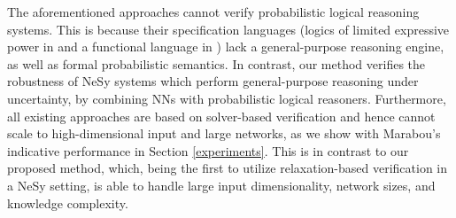 The aforementioned approaches cannot verify probabilistic logical reasoning systems. This is because their specification languages (logics of limited expressive power in \cite{akintunde2020verifying,xie2022neuro} and a functional language in \cite{daggitt2024vehiclebridgingembeddinggap}) lack a general-purpose reasoning engine, as well as formal probabilistic semantics. In contrast, our method verifies the robustness of NeSy systems which perform general-purpose reasoning under uncertainty, by combining NNs with probabilistic logical reasoners. Furthermore, all existing approaches are based on solver-based verification and hence cannot scale to high-dimensional input and large networks, as we show with Marabou's indicative performance in Section \ref{experiments}. This is in contrast to our proposed method, which, being the first to utilize relaxation-based verification in a NeSy setting, is able to handle large input dimensionality, network sizes, and knowledge complexity.


